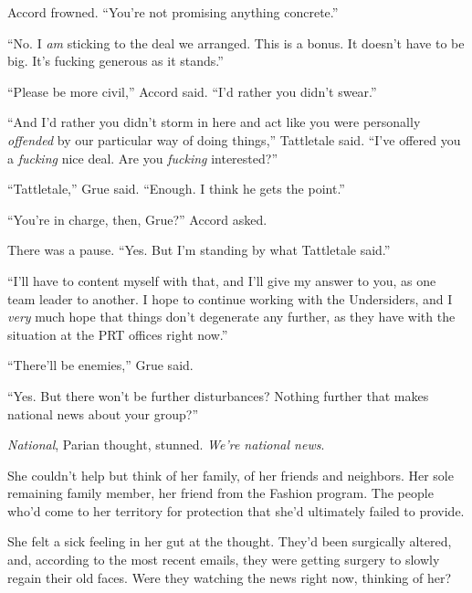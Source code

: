 Accord frowned.  ``You're not promising anything concrete.''



``No.  I \emph{am} sticking to the deal we arranged.  This is a bonus.  It doesn't have to be big.  It's fucking generous as it stands.''



``Please be more civil,'' Accord said.  ``I'd rather you didn't swear.''



``And I'd rather you didn't storm in here and act like you were personally \emph{offended} by our particular way of doing things,'' Tattletale said.  ``I've offered you a \emph{fucking} nice deal.  Are you \emph{fucking} interested?''



``Tattletale,'' Grue said.  ``Enough.  I think he gets the point.''



``You're in charge, then, Grue?'' Accord asked.



There was a pause.  ``Yes.  But I'm standing by what Tattletale said.''



``I'll have to content myself with that, and I'll give my answer to you, as one team leader to another.  I hope to continue working with the Undersiders, and I \emph{very} much hope that things don't degenerate any further, as they have with the situation at the PRT offices right now.''



``There'll be enemies,'' Grue said.



``Yes.  But there won't be further disturbances?  Nothing further that makes national news about your group?''



\emph{National}, Parian thought, stunned.  \emph{We're national news}.



She couldn't help but think of her family, of her friends and neighbors.  Her sole remaining family member, her friend from the Fashion program.  The people who'd come to her territory for protection that she'd ultimately failed to provide.



She felt a sick feeling in her gut at the thought.  They'd been surgically altered, and, according to the most recent emails, they were getting surgery to slowly regain their old faces.  Were they watching the news right now, thinking of her?



